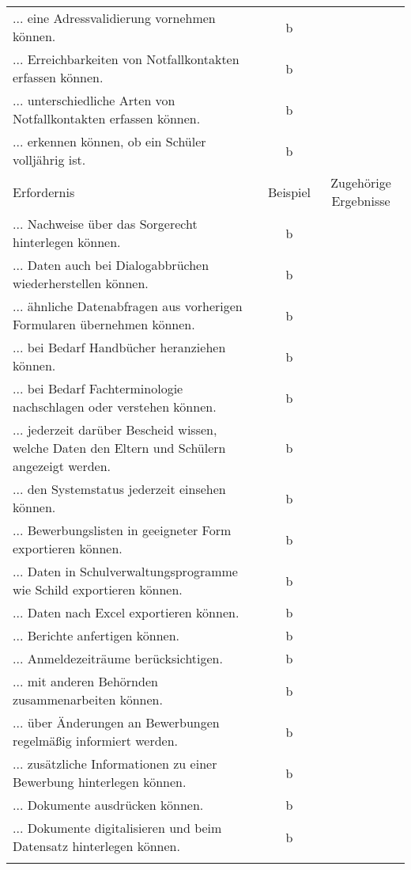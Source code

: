 \begin{landscape}
\begin{longtable}{p{15cm}cc}
            ... eine Adressvalidierung vornehmen können. & b \\
            ... Erreichbarkeiten von Notfallkontakten erfassen können. & b \\
            ... unterschiedliche Arten von Notfallkontakten erfassen können. & b \\
            ... erkennen können, ob ein Schüler volljährig ist. & b \\
        \endfirsthead
        \toprule
        Erfordernis & Beispiel & Zugehörige Ergebnisse \\
        \midrule
        \endhead
        \bottomrule
        \endfoot
            ... Nachweise über das Sorgerecht hinterlegen können. & b \\
            ... Daten auch bei Dialogabbrüchen wiederherstellen können. & b \\
            ... ähnliche Datenabfragen aus vorherigen Formularen übernehmen können. & b \\
            ... bei Bedarf Handbücher heranziehen können. & b \\
            ... bei Bedarf Fachterminologie nachschlagen oder verstehen können. & b \\
            ... jederzeit darüber Bescheid wissen, welche Daten den Eltern und Schülern angezeigt werden. & b \\
            ... den Systemstatus jederzeit einsehen können. & b \\
            ... Bewerbungslisten in geeigneter Form exportieren können. & b \\
            ... Daten in Schulverwaltungsprogramme wie Schild exportieren können. & b \\
            ... Daten nach Excel exportieren können. & b \\
            ... Berichte anfertigen können. & b \\
            ... Anmeldezeiträume berücksichtigen. & b \\
            ... mit anderen Behörnden zusammenarbeiten können. & b \\
            ... über Änderungen an Bewerbungen regelmäßig informiert werden. & b \\
            ... zusätzliche Informationen zu einer Bewerbung hinterlegen können. & b \\
            ... Dokumente ausdrücken können. & b \\
            ... Dokumente digitalisieren und beim Datensatz hinterlegen können. & b \\
    \label{tab:anmeldeformular}
\end{longtable}


\end{landscape}
